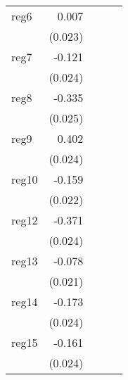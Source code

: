 {\begin{longtable}{l*{4}{D{.}{.}{-1}}}
\addlinespace
reg6        &       0.007         &                     &                     &                     \\
            &     (0.023)         &                     &                     &                     \\
\addlinespace
reg7        &      -0.121\sym{***}&                     &                     &                     \\
            &     (0.024)         &                     &                     &                     \\
\addlinespace
reg8        &      -0.335\sym{***}&                     &                     &                     \\
            &     (0.025)         &                     &                     &                     \\
\addlinespace
reg9        &       0.402\sym{***}&                     &                     &                     \\
            &     (0.024)         &                     &                     &                     \\
\addlinespace
reg10       &      -0.159\sym{***}&                     &                     &                     \\
            &     (0.022)         &                     &                     &                     \\
\addlinespace
reg12       &      -0.371\sym{***}&                     &                     &                     \\
            &     (0.024)         &                     &                     &                     \\
\addlinespace
reg13       &      -0.078\sym{***}&                     &                     &                     \\
            &     (0.021)         &                     &                     &                     \\
\addlinespace
reg14       &      -0.173\sym{***}&                     &                     &                     \\
            &     (0.024)         &                     &                     &                     \\
\addlinespace
reg15       &      -0.161\sym{***}&                     &                     &                     \\
            &     (0.024)         &                     &                     &                     \\

\end{longtable}}
